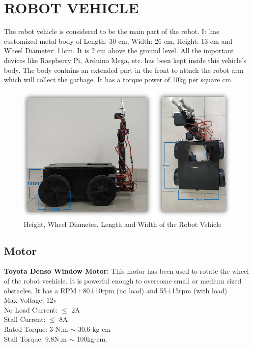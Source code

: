 \documentclass[conference]{IEEEtran}
\begin{document}
	\section{ROBOT VEHICLE}
	The robot vehicle is considered to be the main part of the robot. It has customized metal body of Length: 30 cm, Width: 26 cm, Height: 13 cm and Wheel Diameter: 11cm. It is 2 cm above the ground level. All the important devices like Raspberry Pi, Arduino Mega, etc. has been kept inside this vehicle's body. The body contains an extended part in the front to attach the robot arm which will collect the garbage. It has a torque power of 10kg per square cm.
	
	\begin{figure}[htbp]
		\centerline{\includegraphics[scale=0.5]{heightlengthwidth.png}}
		\caption{Height, Wheel Diameter, Length and Width of the Robot Vehicle}
		\label{fig}
	\end{figure}
	
	
	\subsection{Motor}
	
	\textbf {Toyota Denso Window Motor:}
	This motor has been used to rotate the wheel of the robot veehicle. It is powerful enough to overcome small or medium sized obstacles. It has a RPM :  80±10rpm (no load) and 55±15rpm (with load)
	\\Max Voltage: 12v
	\\No Load Current: $\le$ 2A
	\\Stall Current: $\le$ 8A  
	\\Rated Torque: 3 N.m $\sim$ 30.6 kg-cm 
	\\Stall Torque: 9.8N.m $\sim$ 100kg-cm.
	
\end{document}
